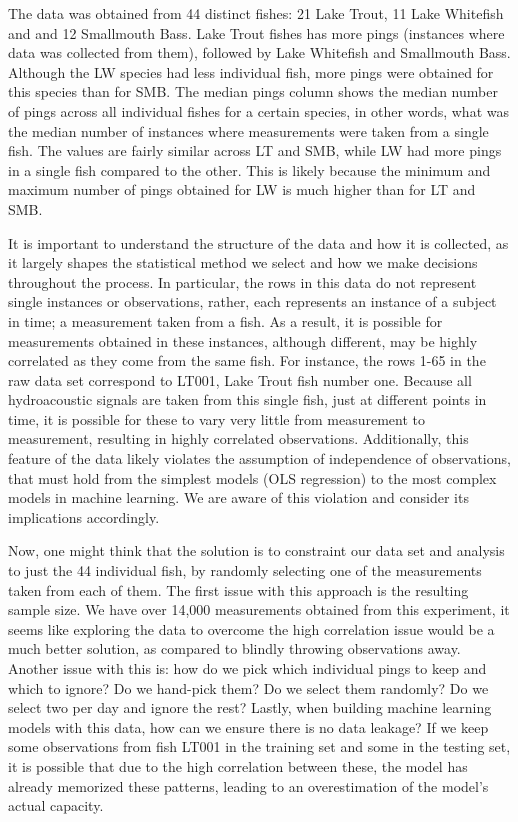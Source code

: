 \documentclass[
  letterpaper,
  DIV=11,
  numbers=noendperiod]{scrartcl}
\begin{document}
The data was obtained from 44 distinct fishes: 21 Lake Trout, 11 Lake
Whitefish and and 12 Smallmouth Bass. Lake Trout fishes has more pings
(instances where data was collected from them), followed by Lake
Whitefish and Smallmouth Bass. Although the LW species had less
individual fish, more pings were obtained for this species than for SMB.
The median pings column shows the median number of pings across all
individual fishes for a certain species, in other words, what was the
median number of instances where measurements were taken from a single
fish. The values are fairly similar across LT and SMB, while LW had more
pings in a single fish compared to the other. This is likely because the
minimum and maximum number of pings obtained for LW is much higher than
for LT and SMB.

It is important to understand the structure of the data and how it is
collected, as it largely shapes the statistical method we select and how
we make decisions throughout the process. In particular, the rows in
this data do not represent single instances or observations, rather,
each represents an instance of a subject in time; a measurement taken
from a fish. As a result, it is possible for measurements obtained in
these instances, although different, may be highly correlated as they
come from the same fish. For instance, the rows 1-65 in the raw data set
correspond to LT001, Lake Trout fish number one. Because all
hydroacoustic signals are taken from this single fish, just at different
points in time, it is possible for these to vary very little from
measurement to measurement, resulting in highly correlated observations.
Additionally, this feature of the data likely violates the assumption of
independence of observations, that must hold from the simplest models
(OLS regression) to the most complex models in machine learning. We are
aware of this violation and consider its implications accordingly.

Now, one might think that the solution is to constraint our data set and
analysis to just the 44 individual fish, by randomly selecting one of
the measurements taken from each of them. The first issue with this
approach is the resulting sample size. We have over 14,000 measurements
obtained from this experiment, it seems like exploring the data to
overcome the high correlation issue would be a much better solution, as
compared to blindly throwing observations away. Another issue with this
is: how do we pick which individual pings to keep and which to ignore?
Do we hand-pick them? Do we select them randomly? Do we select two per
day and ignore the rest? Lastly, when building machine learning models
with this data, how can we ensure there is no data leakage? If we keep
some observations from fish LT001 in the training set and some in the
testing set, it is possible that due to the high correlation between
these, the model has already memorized these patterns, leading to an
overestimation of the model's actual capacity.
\end{document}
